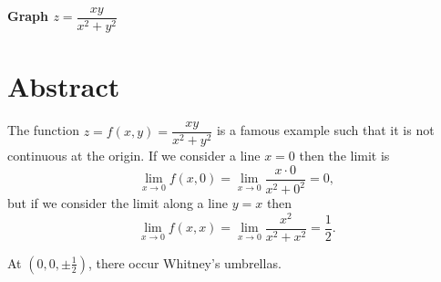 \documentclass[12pt,dvipdfmx]{article}
\begin{document}
\begin{center}

{\bf \Large Graph $z=\dfrac{xy}{x^2+y^2}$}

\end{center}


\section{Abstract}

The function $z=f(x,y)=\dfrac{xy}{x^2+y^2}$ is a famous example such that it is not continuous at the origin. If we consider a line $x=0$ then the limit is 
\[
\lim_{x\to 0}f(x,0) = \lim_{x\to 0}\dfrac{x\cdot 0}{x^2+0^2} = 0,
\]
but if we consider the limit along a line $y=x$ then
\[
\lim_{x\to 0}f(x,x) = \lim_{x\to 0}\dfrac{x^2}{x^2+x^2} = \dfrac{1}{2}.
\]

At $(0,0,\pm \frac{1}{2})$, there occur Whitney's umbrellas.
\end{document}
